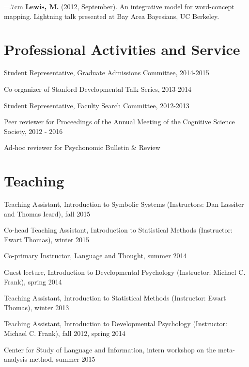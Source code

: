 \documentclass[letterpaper]{article}
\renewenvironment{itemize}{
  \begin{list}{}{
    \setlength{\leftmargin}{1.5em}
  }
}{
  \end{list}
}
\begin{document}
 
 \hangindent=.7cm {\bf Lewis, M.} (2012, September). An integrative model for word-concept mapping. Lightning talk presented at Bay Area Bayesians, UC Berkeley.
 
 
 \singlespacing

\section*{Professional Activities and Service}
\begin{itemize}
\item Student Representative, Graduate Admissions Committee, 2014-2015
\item  Co-organizer of Stanford Developmental Talk Series, 2013-2014
\item Student Representative, Faculty Search Committee, 2012-2013
\item Peer reviewer for Proceedings of the Annual Meeting of the Cognitive Science Society, 2012 -  2016
\item Ad-hoc reviewer for Psychonomic Bulletin \& Review 
\end{itemize}

\section*{Teaching}
\begin{itemize}
\item Teaching Assistant, Introduction to Symbolic Systems (Instructors: Dan Lassiter and Thomas Icard), fall 2015
\item Co-head Teaching Assistant, Introduction to Statistical Methods (Instructor: Ewart Thomas), winter 2015
\item Co-primary Instructor, Language and Thought, summer 2014
\item Guest lecture, Introduction to Developmental Psychology (Instructor: Michael C. Frank), spring 2014
\item Teaching Assistant, Introduction to Statistical Methods (Instructor: Ewart Thomas), winter 2013
\item Teaching Assistant, Introduction to Developmental Psychology (Instructor: Michael C. Frank), fall 2012, spring 2014
\item Center for Study of Language and Information, intern workshop on the meta-analysis method, summer 2015

\end{itemize}
\end{document}
